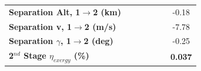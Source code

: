 \begin{table}[ht]
\begin{tabular}{l c c c c c c}
		\textbf{Separation Alt, 1$\rightarrow$2 (km)}
		& \firstsecondSeparationAltmThreeNinetyNoReturn
		& \firstsecondSeparationAltmThreeNinetyFiveNoReturn
		& \firstsecondSeparationAltmThreeStandardNoReturn
		& \firstsecondSeparationAltmThreeOneHundredFiveNoReturn
		& \firstsecondSeparationAltmThreeOneHundredTenNoReturn
		&-0.18
		\\
		\textbf{Separation v, 1$\rightarrow$2 (m/s)}
		& \firstsecondSeparationvmThreeNinetyNoReturn
		& \firstsecondSeparationvmThreeNinetyFiveNoReturn
		& \firstsecondSeparationvmThreeStandardNoReturn
		& \firstsecondSeparationvmThreeOneHundredFiveNoReturn
		& \firstsecondSeparationvmThreeOneHundredTenNoReturn
		&-7.78
		\\
		\textbf{Separation $\gamma$, 1$\rightarrow$2 (deg)}
		& \firstsecondSeparationgammamThreeNinetyNoReturn
		& \firstsecondSeparationgammamThreeNinetyFiveNoReturn
		& \firstsecondSeparationgammamThreeStandardNoReturn
		& \firstsecondSeparationgammamThreeOneHundredFiveNoReturn
		& \firstsecondSeparationgammamThreeOneHundredTenNoReturn
		&-0.25
		\\
		\hline 
		\textbf{2$^{nd}$ Stage $\eta_{exergy}$ (\%)}
		& \textbf{\secondExergyEffmThreeNinetyNoReturn}
		& \textbf{\secondExergyEffmThreeNinetyFiveNoReturn}
		& \textbf{\secondExergyEffmThreeStandardNoReturn}
		& \textbf{\secondExergyEffmThreeOneHundredFiveNoReturn}
		& \textbf{\secondExergyEffmThreeOneHundredTenNoReturn}
		& \textbf{0.037}
		\\
	

\end{tabular}
\end{table}
